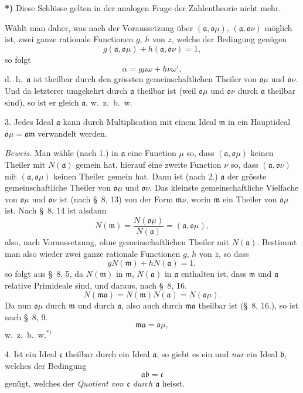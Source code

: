 \documentclass{article}
\begin{document}
\textbf{*)} Diese Schlüsse gelten in der analogen Frage der Zahlentheorie nicht mehr.

Wählt man daher, was nach der Voraussetzung über $(\mathfrak{a}, \mathfrak{o}\mu)$, $(\mathfrak{a}, \mathfrak{o}\nu)$ möglich ist, zwei ganze rationale Functionen $g$, $h$ von $z$, welche der Bedingung genügen
\[ g(\mathfrak{a}, \mathfrak{o}\mu) + h(\mathfrak{a}, \mathfrak{o}\nu) = 1, \]
so folgt
\[ \alpha = g\mu\omega + h\nu\omega', \]
d.\ h.\ $\mathfrak{a}$ ist theilbar durch den grössten gemeinschaftlichen Theiler von $\mathfrak{o}\mu$ und $\mathfrak{o}\nu$. Und da letzterer umgekehrt durch $\mathfrak{a}$ theilbar ist (weil $\mathfrak{o}\mu$ und $\mathfrak{o}\nu$ durch $\mathfrak{a}$ theilbar sind), so ist er gleich $\mathfrak{a}$, w.\ z.\ b.\ w.

3. Jedes Ideal $\mathfrak{a}$ kann durch Multiplication mit einem Ideal $\mathfrak{m}$ in ein Hauptideal $\mathfrak{o}\mu = \mathfrak{a}\mathfrak{m}$ verwandelt werden.

\emph{Beweis.} Man wähle (nach 1.) in $\mathfrak{a}$ eine Function $\mu$ so, dass $(\mathfrak{a}, \mathfrak{o}\mu)$ keinen Theiler mit $N(\mathfrak{a})$ gemein hat, hierauf eine zweite Function $\nu$ so, dass $(\mathfrak{a}, \mathfrak{o}\nu)$ mit $(\mathfrak{a}, \mathfrak{o}\mu)$ keinen Theiler gemein hat. Dann ist (nach 2.) $\mathfrak{a}$ der grösste gemeinschaftliche Theiler von $\mathfrak{o}\mu$ und $\mathfrak{o}\nu$. Das kleinste gemeinschaftliche Vielfache von $\mathfrak{o}\mu$ und $\mathfrak{o}\nu$ ist (nach §~8, 13) von der Form $\mathfrak{m}\nu$, worin $\mathfrak{m}$ ein Theiler von $\mathfrak{o}\mu$ ist. Nach §~8, 14 ist alsdann
\[ N(\mathfrak{m}) = \frac{N(\mathfrak{o}\mu)}{N(\mathfrak{a})} = (\mathfrak{a}, \mathfrak{o}\mu), \]
also, nach Voraussetzung, ohne gemeinschaftlichen Theiler mit $N(\mathfrak{a})$. Bestimmt man also wieder zwei ganze rationale Functionen $g$, $h$ von $z$, so dass
\[ gN(\mathfrak{m}) + hN(\mathfrak{a}) = 1, \]
so folgt aus §~8, 5, da $N(\mathfrak{m})$ in $\mathfrak{m}$, $N(\mathfrak{a})$ in $\mathfrak{a}$ enthalten ist, dass $\mathfrak{m}$ und $\mathfrak{a}$ relative Primideale sind, und daraus, nach §~8, 16.
\[ N(\mathfrak{m}\mathfrak{a}) = N(\mathfrak{m})N(\mathfrak{a}) = N(\mathfrak{o}\mu). \]
Da nun $\mathfrak{o}\mu$ durch $\mathfrak{m}$ und durch $\mathfrak{a}$, also auch durch $\mathfrak{m}\mathfrak{a}$ theilbar ist (§~8, 16.), so ist nach §~8, 9.
\[ \mathfrak{m}\mathfrak{a} = \mathfrak{o}\mu, \]
w.\ z.\ b.\ w.${}^{*)}$

4. Ist ein Ideal $\mathfrak{c}$ theilbar durch ein Ideal $\mathfrak{a}$, so giebt es ein und \emph{nur} ein Ideal $\mathfrak{b}$, welches der Bedingung
\[ \mathfrak{a}\mathfrak{b} = \mathfrak{c} \]
genügt, welches der \emph{Quotient von $\mathfrak{c}$ durch $\mathfrak{a}$} heisst.
\end{document}
